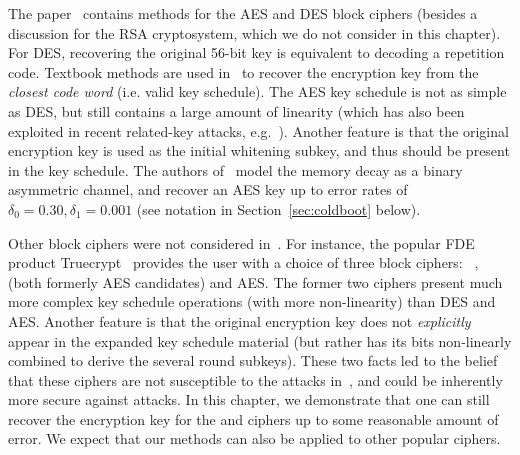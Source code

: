 The paper~\cite{coldboot08} contains methods for the AES and DES block ciphers (besides a discussion for the RSA cryptosystem, which we do not consider in this chapter). For DES, recovering the original 56-bit key is equivalent to decoding a repetition code. Textbook methods are used in~\cite{coldboot08} to recover the encryption key from the \emph{closest code word} (i.e. valid key schedule). The AES key schedule is not as simple as DES, but still contains a large amount of linearity (which has also been exploited in recent related-key attacks, e.g.~\cite{aes-rka}). Another feature is that the original encryption key is used as the initial whitening subkey, and thus should be present in the key schedule. The authors of~\cite{coldboot08} model the memory decay as a binary asymmetric channel, and recover an AES key up to error rates of $\delta_0 = 0.30,\delta_1=0.001$ (see notation in Section~\ref{sec:coldboot} below).


Other block ciphers were not considered in~\cite{coldboot08}. For instance, the popular FDE product Truecrypt~\cite{truecrypt} provides the user with a choice of three block ciphers: \Serpent~\cite{serpent}, \Twofish~\cite{twofish} (both formerly AES candidates) and AES. The former two ciphers present much more complex key schedule operations (with more non-linearity) than DES and AES. Another feature is that the original encryption key does not \emph{explicitly} appear in the expanded key schedule material (but rather has its bits non-linearly combined to derive the several round subkeys). These two facts led to the belief that these ciphers are not susceptible to the attacks in~\cite{coldboot08}, and could be inherently more secure against \coldboot attacks. In this chapter, we demonstrate that one can still recover the encryption key for the \Serpent and \Twofish ciphers up to some reasonable amount of error. We expect that our methods can also be applied to other popular ciphers.
  

